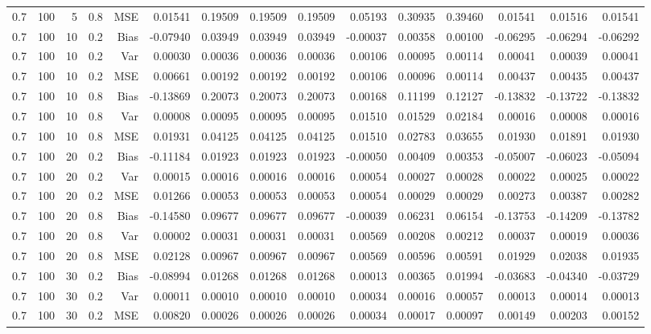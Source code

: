 \begin{table}[!htbp]
\begin{tabular}{lrrrrrrrrrrrrrr}
0.7 & 100 &  5 & 0.8 & MSE & 0.01541 & 0.19509 & 0.19509 & 0.19509 & 0.05193 & 0.30935 & 0.39460 & 0.01541 & 0.01516 & 0.01541 \\
0.7 & 100 & 10 & 0.2 & Bias & -0.07940 & 0.03949 & 0.03949 & 0.03949 & -0.00037 & 0.00358 & 0.00100 & -0.06295 & -0.06294 & -0.06292 \\
0.7 & 100 & 10 & 0.2 & Var & 0.00030 & 0.00036 & 0.00036 & 0.00036 & 0.00106 & 0.00095 & 0.00114 & 0.00041 & 0.00039 & 0.00041 \\
0.7 & 100 & 10 & 0.2 & MSE & 0.00661 & 0.00192 & 0.00192 & 0.00192 & 0.00106 & 0.00096 & 0.00114 & 0.00437 & 0.00435 & 0.00437 \\
0.7 & 100 & 10 & 0.8 & Bias & -0.13869 & 0.20073 & 0.20073 & 0.20073 & 0.00168 & 0.11199 & 0.12127 & -0.13832 & -0.13722 & -0.13832 \\
0.7 & 100 & 10 & 0.8 & Var & 0.00008 & 0.00095 & 0.00095 & 0.00095 & 0.01510 & 0.01529 & 0.02184 & 0.00016 & 0.00008 & 0.00016 \\
0.7 & 100 & 10 & 0.8 & MSE & 0.01931 & 0.04125 & 0.04125 & 0.04125 & 0.01510 & 0.02783 & 0.03655 & 0.01930 & 0.01891 & 0.01930 \\
0.7 & 100 & 20 & 0.2 & Bias & -0.11184 & 0.01923 & 0.01923 & 0.01923 & -0.00050 & 0.00409 & 0.00353 & -0.05007 & -0.06023 & -0.05094 \\
0.7 & 100 & 20 & 0.2 & Var & 0.00015 & 0.00016 & 0.00016 & 0.00016 & 0.00054 & 0.00027 & 0.00028 & 0.00022 & 0.00025 & 0.00022 \\
0.7 & 100 & 20 & 0.2 & MSE & 0.01266 & 0.00053 & 0.00053 & 0.00053 & 0.00054 & 0.00029 & 0.00029 & 0.00273 & 0.00387 & 0.00282 \\
0.7 & 100 & 20 & 0.8 & Bias & -0.14580 & 0.09677 & 0.09677 & 0.09677 & -0.00039 & 0.06231 & 0.06154 & -0.13753 & -0.14209 & -0.13782 \\
0.7 & 100 & 20 & 0.8 & Var & 0.00002 & 0.00031 & 0.00031 & 0.00031 & 0.00569 & 0.00208 & 0.00212 & 0.00037 & 0.00019 & 0.00036 \\
0.7 & 100 & 20 & 0.8 & MSE & 0.02128 & 0.00967 & 0.00967 & 0.00967 & 0.00569 & 0.00596 & 0.00591 & 0.01929 & 0.02038 & 0.01935 \\
0.7 & 100 & 30 & 0.2 & Bias & -0.08994 & 0.01268 & 0.01268 & 0.01268 & 0.00013 & 0.00365 & 0.01994 & -0.03683 & -0.04340 & -0.03729 \\
0.7 & 100 & 30 & 0.2 & Var & 0.00011 & 0.00010 & 0.00010 & 0.00010 & 0.00034 & 0.00016 & 0.00057 & 0.00013 & 0.00014 & 0.00013 \\
0.7 & 100 & 30 & 0.2 & MSE & 0.00820 & 0.00026 & 0.00026 & 0.00026 & 0.00034 & 0.00017 & 0.00097 & 0.00149 & 0.00203 & 0.00152 \\

\end{tabular}
\end{table}
